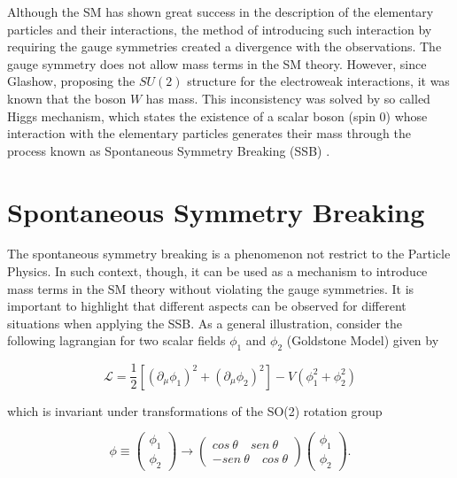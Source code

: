 Although the SM has shown great success in the description of the elementary particles and their interactions, the method of introducing such interaction by requiring the gauge symmetries created a divergence with the observations. The gauge symmetry does not allow mass terms in the SM theory. However, since Glashow, proposing the $SU(2)$ structure for the electroweak interactions, it was known that the boson $W$ has mass. This inconsistency was solved by so called Higgs mechanism, which states the existence of a scalar boson (spin 0) whose interaction with the elementary particles generates their mass through the process known as Spontaneous Symmetry Breaking (SSB) \cite{bib:whitbeck-2013,bib:griffiths-2008}.

\section{Spontaneous Symmetry Breaking}
The spontaneous symmetry breaking is a phenomenon not restrict to the Particle Physics. In such context, though, it can be used as a mechanism to introduce mass terms in the SM theory without violating the gauge symmetries. It is important to highlight that different aspects can be observed for different situations when applying the SSB. As a general illustration, consider the following lagrangian for two scalar fields $\phi_1$ and $\phi_2$ (Goldstone Model) given by

\begin{equation}
\mathcal{L} = \dfrac{1}{2}[(\partial_{\mu}\phi_1)^2 + (\partial_{\mu}\phi_2)^2 ] - V(\phi_1^2 + \phi_2^2)
\label{eq:Goldstone_potential}
\end{equation}  

which is invariant under transformations of the SO(2) rotation group

\begin{equation}
\phi \equiv \left(\begin{aligned} \phi_1 \\ \phi_2 \end{aligned} \right) \rightarrow \left(\begin{aligned} cos \!\ \theta \quad sen \!\ \theta \\ -sen \!\ \theta \quad cos \!\ \theta \end{aligned} \right) \left(\begin{aligned} \phi_1 \\ \phi_2 \end{aligned} \right). 
\end{equation}

